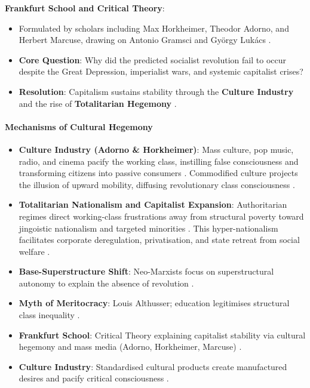 \begin{KeyConcept}
\textbf{Frankfurt School and Critical Theory}:
\begin{itemize}
    \item Formulated by scholars including Max Horkheimer, Theodor Adorno, and Herbert Marcuse, drawing on Antonio Gramsci and Gy\"orgy Luk\'acs .
    \item \textbf{Core Question}: Why did the predicted socialist revolution fail to occur despite the Great Depression, imperialist wars, and systemic capitalist crises? 
    \item \textbf{Resolution}: Capitalism sustains stability through the \textbf{Culture Industry} and the rise of \textbf{Totalitarian Hegemony} .
\end{itemize}
\end{KeyConcept}

\paragraph{Mechanisms of Cultural Hegemony}
\begin{itemize}
    \item \textbf{Culture Industry (Adorno \& Horkheimer)}: Mass culture, pop music, radio, and cinema pacify the working class, instilling false consciousness and transforming citizens into passive consumers . Commodified culture projects the illusion of upward mobility, diffusing revolutionary class consciousness .
    \item \textbf{Totalitarian Nationalism and Capitalist Expansion}: Authoritarian regimes direct working-class frustrations away from structural poverty toward jingoistic nationalism and targeted minorities . This hyper-nationalism facilitates corporate deregulation, privatisation, and state retreat from social welfare .
\end{itemize}

\begin{QuickRevision}
\begin{itemize}
    \item \textbf{Base-Superstructure Shift}: Neo-Marxists focus on superstructural autonomy to explain the absence of revolution .
    \item \textbf{Myth of Meritocracy}: Louis Althusser; education legitimises structural class inequality .
    \item \textbf{Frankfurt School}: Critical Theory explaining capitalist stability via cultural hegemony and mass media (Adorno, Horkheimer, Marcuse) .
    \item \textbf{Culture Industry}: Standardised cultural products create manufactured desires and pacify critical consciousness .
\end{itemize}
\end{QuickRevision}

